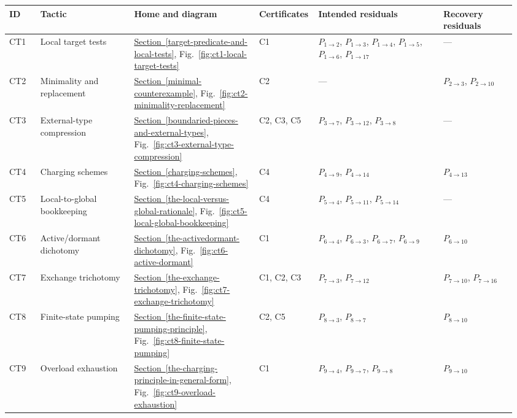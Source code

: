 \documentclass[
  11pt,
]{article}
\theoremstyle{definition}
\newcommand{\secref}[1]{\hyperref[#1]{Section~\ref*{#1}}}
\begin{document}
\begingroup
\tiny
\setlength{\tabcolsep}{1.1pt}
\begin{longtable}[]{@{}
  >{\raggedright\arraybackslash}p{0.06\linewidth}
  >{\raggedright\arraybackslash}p{0.18\linewidth}
  >{\raggedright\arraybackslash}p{0.24\linewidth}
  >{\raggedright\arraybackslash}p{0.10\linewidth}
  >{\raggedright\arraybackslash}p{0.24\linewidth}
  >{\raggedright\arraybackslash}p{0.14\linewidth}@{}}
\toprule\noalign{}
ID & Tactic & Home and diagram & Certificates & Intended residuals & Recovery residuals \\
\midrule\noalign{}
\endhead
\bottomrule\noalign{}
\endlastfoot
CT1 & Local target tests & \secref{target-predicate-and-local-tests}, Fig.~\ref{fig:ct1-local-target-tests} & C1 & \(P_{1\to2}\), \(P_{1\to3}\), \(P_{1\to4}\), \(P_{1\to5}\), \(P_{1\to6}\), \(P_{1\to17}\) & --- \\
CT2 & Minimality and replacement & \secref{minimal-counterexample}, Fig.~\ref{fig:ct2-minimality-replacement} & C2 & --- & \(P_{2\to3}\), \(P_{2\to10}\) \\
CT3 & External-type compression & \secref{boundaried-pieces-and-external-types}, Fig.~\ref{fig:ct3-external-type-compression} & C2, C3, C5 & \(P_{3\to7}\), \(P_{3\to12}\), \(P_{3\to8}\) & --- \\
CT4 & Charging schemes & \secref{charging-schemes}, Fig.~\ref{fig:ct4-charging-schemes} & C4 & \(P_{4\to9}\), \(P_{4\to14}\) & \(P_{4\to13}\) \\
CT5 & Local-to-global bookkeeping & \secref{the-local-versus-global-rationale}, Fig.~\ref{fig:ct5-local-global-bookkeeping} & C4 & \(P_{5\to4}\), \(P_{5\to11}\), \(P_{5\to14}\) & --- \\
CT6 & Active/dormant dichotomy & \secref{the-activedormant-dichotomy}, Fig.~\ref{fig:ct6-active-dormant} & C1 & \(P_{6\to4}\), \(P_{6\to3}\), \(P_{6\to7}\), \(P_{6\to9}\) & \(P_{6\to10}\) \\
CT7 & Exchange trichotomy & \secref{the-exchange-trichotomy}, Fig.~\ref{fig:ct7-exchange-trichotomy} & C1, C2, C3 & \(P_{7\to3}\), \(P_{7\to12}\) & \(P_{7\to10}\), \(P_{7\to16}\) \\
CT8 & Finite-state pumping & \secref{the-finite-state-pumping-principle}, Fig.~\ref{fig:ct8-finite-state-pumping} & C2, C5 & \(P_{8\to3}\), \(P_{8\to7}\) & \(P_{8\to10}\) \\
CT9 & Overload exhaustion & \secref{the-charging-principle-in-general-form}, Fig.~\ref{fig:ct9-overload-exhaustion} & C1 & \(P_{9\to4}\), \(P_{9\to7}\), \(P_{9\to8}\) & \(P_{9\to10}\) \\

\end{longtable}
\end{document}
